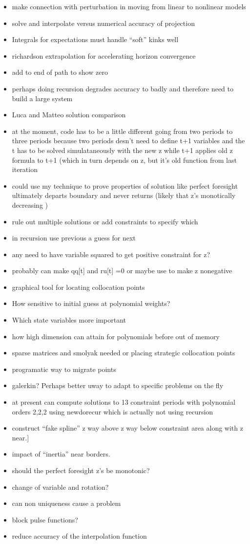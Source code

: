\documentclass[12pt]{article}
\begin{document}
\begin{itemize}
\item make connection with perturbation in moving from linear to nonlinear models
\item solve and interpolate versus numerical accuracy of projection
\item Integrals for expectations must handle ``soft'' kinks well
\item richardson extrapolation for accelerating horizon convergence
\item add to end of path to show zero
\item perhaps doing recursion degrades accuracy to badly and therefore need to build a large system
\item Luca and Matteo solution comparison
\item at the moment, code has to be a little different going from two periods to three periods because two periods desn't need to define  t+1 variables and the t has to be solved simulataneously with the new z while t+1 applies old z formula to t+1 (which in turn depends on z, but it's old function from last iteration
\item could use my technique to prove properties of solution like perfect foresight ultimately departs boundary and never returns  (likely that z's monotically decreasing )
\item rule out multiple solutions or add constraints to specify which
\item in recursion use previous a guess for next
\item any need to have variable squared to get positive constraint for z?
\item probably can make qq[t] and ru[t] =0 or maybe use to make z nonegative
\item graphical tool for locating collocation points
\item How sensitive to initial guess at polynomial weights?
\item Which state variables more important
\item how high dimension can attain for polynomials before out of memory
\item sparse matrices and smolyak needed or placing strategic collocation points
\item programatic way to migrate points
\item galerkin?  Perhaps better uway to adapt to specific problems on the fly
\item at present can compute solutions to 13 constraint periods with  polynomial orders  2,2,2 using newdorecur which is actually not using recursion
\item construct ``fake spline'' z way above z way below constraint area along with z near.]
\item impact of ``inertia'' near borders.
\item should the perfect foresight z's be monotonic?
\item change of variable and rotation?
\item can non uniqueness cause a problem
\item block pulse functions?
\item reduce accuracy of the interpolation function
\end{itemize}
\end{document}

